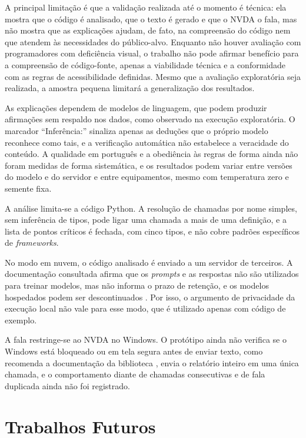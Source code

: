\documentclass[
    12pt,                   %
    openright,              %
    oneside,                %
    a4paper,                %
    sumario=tradicional,    %
    english,                %
    brazil,                 %
    ]{abntex2}
\begin{document}
A principal limitação é que a validação realizada até o momento é técnica: ela mostra que o código é analisado, que o texto é gerado e que o NVDA o fala, mas não mostra que as explicações ajudam, de fato, na compreensão do código nem que atendem às necessidades do público-alvo. Enquanto não houver avaliação com programadores com deficiência visual, o trabalho não pode afirmar benefício para a compreensão de código-fonte, apenas a viabilidade técnica e a conformidade com as regras de acessibilidade definidas. Mesmo que a avaliação exploratória seja realizada, a amostra pequena limitará a generalização dos resultados.

As explicações dependem de modelos de linguagem, que podem produzir afirmações sem respaldo nos dados, como observado na execução exploratória. O marcador \enquote{Inferência:} sinaliza apenas as deduções que o próprio modelo reconhece como tais, e a verificação automática não estabelece a veracidade do conteúdo. A qualidade em português e a obediência às regras de forma ainda não foram medidas de forma sistemática, e os resultados podem variar entre versões do modelo e do servidor e entre equipamentos, mesmo com temperatura zero e semente fixa.

A análise limita-se a código Python. A resolução de chamadas por nome simples, sem inferência de tipos, pode ligar uma chamada a mais de uma definição, e a lista de pontos críticos é fechada, com cinco tipos, e não cobre padrões específicos de \textit{frameworks}.

No modo em nuvem, o código analisado é enviado a um servidor de terceiros. A documentação consultada afirma que os \textit{prompts} e as respostas não são utilizados para treinar modelos, mas não informa o prazo de retenção, e os modelos hospedados podem ser descontinuados \cite{ollama2026nuvem}. Por isso, o argumento de privacidade da execução local não vale para esse modo, que é utilizado apenas com código de exemplo.

A fala restringe-se ao NVDA no Windows. O protótipo ainda não verifica se o Windows está bloqueado ou em tela segura antes de enviar texto, como recomenda a documentação da biblioteca \cite{nvaccess2024controller}, envia o relatório inteiro em uma única chamada, e o comportamento diante de chamadas consecutivas e de fala duplicada ainda não foi registrado.

\section{Trabalhos Futuros}
\end{document}
